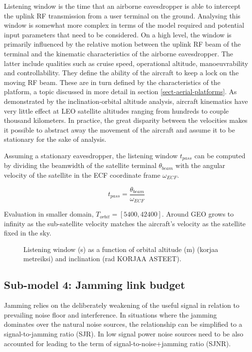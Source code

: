 \documentclass[english, 12pt, a4paper, elec, utf8, a-1b, online]{aaltothesis}
\begin{document}
Listening window is the time that an airborne eavesdropper is able to intercept the uplink RF transmission from a user terminal on the ground.
Analysing this window is somewhat more complex in terms of the model required and potential input parameters that need to be considered.
On a high level, the window is primarily influenced by the relative motion between the uplink RF beam of the terminal and the kinematic characteristics of the airborne eavesdropper.
The latter include qualities such as cruise speed, operational altitude, manoeuvrability and controllability.
They define the ability of the aircraft to keep a lock on the moving RF beam.
These are in turn defined by the characteristics of the platform, a topic discussed in more detail in section \ref{sect-aerial-platforms}.
As demonstrated by the inclination-orbital altitude analysis, aircraft kinematics have very little effect at LEO satellite altitudes ranging from hundreds to couple thousand kilometers. In practice, the great disparity between the velocities makes it possible to abstract away the movement of the aircraft and assume it to be stationary for the sake of analysis.

Assuming a stationary eavesdropper, the listening window ${t_{pass}}$ can be computed by dividing the beamwidth of the satellite terminal $\theta_{beam}$ with the angular velocity of the satellite in the ECF coordinate frame $\omega_{ECF}$.

\begin{equation}
  t_{pass} = \frac{\theta_{beam}}{\omega_{ECF}}
\end{equation}

Evaluation in smaller domain, $T_{orbit} = [5400, 42400]$. Around GEO grows to infinity as the sub-satellite velocity matches the aircraft's velocity as the satellite fixed in the sky.
\begin{figure}[h]
  \centering
  
  \caption{Listening window (s) as a function of orbital altitude (m) (korjaa metreiksi) and inclination (rad KORJAA ASTEET).} %
  \label{fig-subsat-velocity-inclined}
\end{figure}

\subsection{Sub-model 4: Jamming link budget}
Jamming relies on the deliberately weakening of the useful signal in relation to prevailing noise floor and interference. In situations where the jamming dominates over the natural noise sources, the relationship can be simplified to a signal-to-jamming ratio (SJR). In low signal power noise sources need to be also accounted for leading to the term of signal-to-noise+jamming ratio (SJNR).
\end{document}
